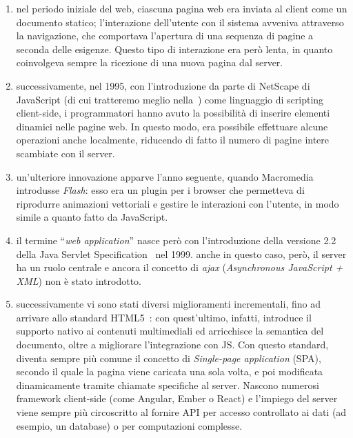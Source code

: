   \begin{enumerate}
    \item
      nel periodo iniziale del web, ciascuna pagina web era inviata al client come un documento statico;
      l'interazione dell'utente con il sistema avveniva attraverso la navigazione, che comportava l'apertura di una sequenza di pagine a seconda delle esigenze.
      Questo tipo di interazione era però lenta, in quanto coinvolgeva sempre la ricezione di una nuova pagina dal server.
    \item
      successivamente, nel 1995, con l'introduzione da parte di NetScape di JavaScript (di cui tratteremo meglio nella~) come linguaggio di scripting client-side, i programmatori hanno avuto la possibilità di inserire elementi dinamici nelle pagine web.
      In questo modo, era possibile effettuare alcune operazioni anche localmente, riducendo di fatto il numero di pagine intere scambiate con il server.
    \item
      un'ulteriore innovazione apparve l'anno seguente, quando Macromedia introdusse \emph{Flash}:
      esso era un plugin per i browser che permetteva di riprodurre animazioni vettoriali e gestire le interazioni con l'utente, in modo simile a quanto fatto da JavaScript.
    \item
      il termine ``\emph{web application}'' nasce però con l'introduzione della versione 2.2 della Java Servlet Specification~\cite{java1999specification} nel 1999.
      anche in questo caso, però, il server ha un ruolo centrale e ancora il concetto di \emph{ajax} (\emph{Asynchronous JavaScript + XML}) non è stato introdotto.
    \item
      successivamente vi sono stati diversi miglioramenti incrementali, fino ad arrivare allo standard HTML5~\cite{Smith2008}:
      con quest'ultimo, infatti, introduce il supporto nativo ai contenuti multimediali ed arricchisce la semantica del documento, oltre a migliorare l'integrazione con JS\@.
      Con questo standard, diventa sempre più comune il concetto di \emph{Single-page application} (SPA), secondo il quale la pagina viene caricata una sola volta, e poi modificata dinamicamente tramite chiamate specifiche al server.
      Nascono numerosi framework client-side (come Angular, Ember o React) e l'impiego del server viene sempre più circoscritto al fornire API per accesso controllato ai dati (ad esempio, un database) o per computazioni complesse.
  \end{enumerate}


